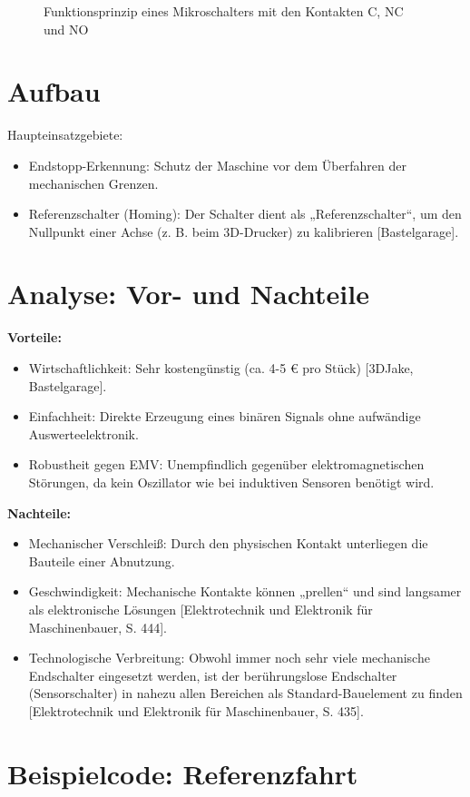 \begin{figure}[H]
	\centering
	
	\caption{Funktionsprinzip eines Mikroschalters mit den Kontakten C, NC und NO}
	\label{fig:microswitch_principle}
\end{figure}
\newpage
\section{Aufbau}



Haupteinsatzgebiete:

\begin{itemize}
	\item Endstopp-Erkennung: Schutz der Maschine vor dem Überfahren der mechanischen Grenzen.
	\item Referenzschalter (Homing): Der Schalter dient als „Referenzschalter“, um den Nullpunkt einer Achse (z. B. beim 3D-Drucker) zu kalibrieren [Bastelgarage].
\end{itemize}

\section{Analyse: Vor- und Nachteile}

\textbf{Vorteile:}

\begin{itemize}
	\item Wirtschaftlichkeit: Sehr kostengünstig (ca. 4-5 € pro Stück) [3DJake, Bastelgarage].
	\item Einfachheit: Direkte Erzeugung eines binären Signals ohne aufwändige Auswerteelektronik.
	\item Robustheit gegen EMV: Unempfindlich gegenüber elektromagnetischen Störungen, da kein Oszillator wie bei induktiven Sensoren benötigt wird.
\end{itemize}

\textbf{Nachteile:}

\begin{itemize}
	\item Mechanischer Verschleiß: Durch den physischen Kontakt unterliegen die Bauteile einer Abnutzung.
	\item Geschwindigkeit: Mechanische Kontakte können „prellen“ und sind langsamer als elektronische Lösungen [Elektrotechnik und Elektronik für Maschinenbauer, S. 444].
	\item Technologische Verbreitung: Obwohl immer noch sehr viele mechanische Endschalter eingesetzt werden, ist der berührungslose Endschalter (Sensorschalter) in nahezu allen Bereichen als Standard-Bauelement zu finden [Elektrotechnik und Elektronik für Maschinenbauer, S. 435].
\end{itemize}

\clearpage
\section{Beispielcode: Referenzfahrt}

